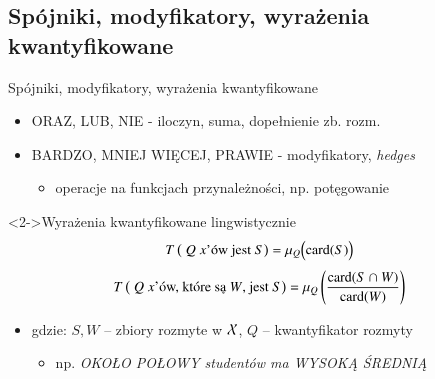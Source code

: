\documentclass{beamer}
\newcommand{\card}{\mbox{\textnormal{{c}ard}}
}
\begin{document}
\subsection{Spójniki, modyfikatory, wyrażenia kwantyfikowane}
\begin{frame}{Spójniki, modyfikatory, wyrażenia kwantyfikowane}%
\begin{itemize}
\item ORAZ, LUB, NIE - iloczyn, suma, dopełnienie zb. rozm. 
\item BARDZO, MNIEJ WIĘCEJ, PRAWIE - modyfikatory, {\em hedges}
\begin{itemize}
\item operacje na funkcjach przynależności, np. potęgowanie
\end{itemize}
\end{itemize}

\begin{block}<2->{Wyrażenia kwantyfikowane lingwistycznie}
\begin{equation} \label{eq.truthofformcanq1}
T\left(\mbox{ $Q$ $x$'ów jest $S$} \right) = \mu_Q \Big(\card(S)\Big)
\end{equation}
\begin{equation} \label{eq.truthofformcanq2}
T\left(\mbox{ $Q$ $x$'ów, które są $W$, jest $S$} \right) = \mu_Q \left(
{{\card(S \cap W)}\over{\card(W)}}  \right)
\end{equation}
\end{block}

\begin{itemize}
\item <3-> gdzie: $S, W$ -- zbiory rozmyte w $\cal X$, $Q$ -- kwantyfikator rozmyty\begin{itemize}
\item np. {\em OKOŁO POŁOWY studentów ma WYSOKĄ ŚREDNIĄ}
\end{itemize}
\end{itemize}
\end{frame}
\end{document}
